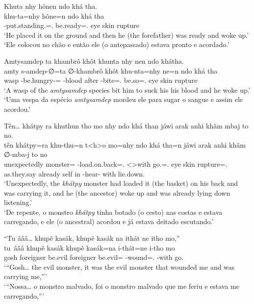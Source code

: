 \documentclass[output=paper,
modfonts,nonflat
]{langsci/langscibook}
\begin{document}
\largerpage
\ea  Khuta nhy hõnen ndo khá tha. \\[.3em]
\gll khu-ta=nhy                           hõne=n              ndo khá  tha     \\
     \Third-put.standing.\Sg{}=\AAnd.\Ds{} be.ready=\AAnd.\Ss{} eye skin rupture \\
\glt `He placed it on the ground and then he (the forefather) was ready and woke up.' \\
     `Ele colocou no chão e então ele (o antepassado) estava pronto e acordado.' \\
\z

\ea  Amtysamdep ta khambrô khôt khunta nhy nen ndo khátha. \\[.3em]
\gll amty s-amdep-∅=ta                    ∅-khambrô    khôt  khu-nta=nhy            ne=n             ndo khá  tha     \\
     wasp \Third-be.hungry-\Nmlz{}=\Nom{} \Third-blood after \Third-bite=\AAnd.\Ds{} be.so=\AAnd.\Ss{} eye skin rupture \\
\glt `A wasp of the \textit{amtysamdep} species bit him to suck his his blood and he woke up.' \\
     `Uma vespa da espécio \textit{amtysamdep} mordeu ele para sugar o sangue e assim ele acordou.' \\
\label{exe:subadjppdirargver}
\z

\ea  Tên\ldots{} khátpy ra khuthun tho mo nhy ndo khá than jáwi arak anhi khãm mbaj to no. \\[.3em]
\gll tên          khátpy=ra      khu-thu=n                      t<h>o        mo=nhy              ndo khá  tha=n              jáwi        arak    anhi khãm ∅-mba-j             to   no             \\
     unexpectedly monster=\Nom{} \Third-load.on.back=\AAnd.\Ss{} <\Third>with go.\Pl{}=\AAnd.\Ds{} eye skin rupture=\AAnd.\Ss{} as.they.say already self in   \Third-hear-\Nmlz{} with lie.down.\Sg{} \\
\glt `Unexpectedly, the \textit{khátpy} monster had loaded it (the basket) on his back and was carrying it, and he (the ancestor) woke up and was already lying down listening.' \\
     `De repente, o monstro \textit{khátpy} tinha botado (o cesto) nas costas e estava carregando, e ele (o ancestral) acordou e já estava deitado escutando.' \\
\label{exe:nommaintran}
\z

\ea  ``Tu âââ\ldots{} khupẽ kasák, khupẽ kasák na ithát ne itho mo,'' \\[.3em]
\gll tu\ âââ khupẽ     kasák   khupẽ     kasák=na         i-thát=ne               i-tho       mo       \\
     gosh    foreigner be.evil foreigner be.evil=\N\Fut{} \First-wound=\AAnd.\Ss{} \First-with go.\Sg{} \\
\glt `{}``Gosh\ldots{} the evil monster, it was the evil monster that wounded me and was carrying me,''{}' \\
     `{}``Nossa\ldots{} o monstro malvado, foi o monstro malvado que me feriu e estava me carregando,''{}' \\
\z
\end{document}
